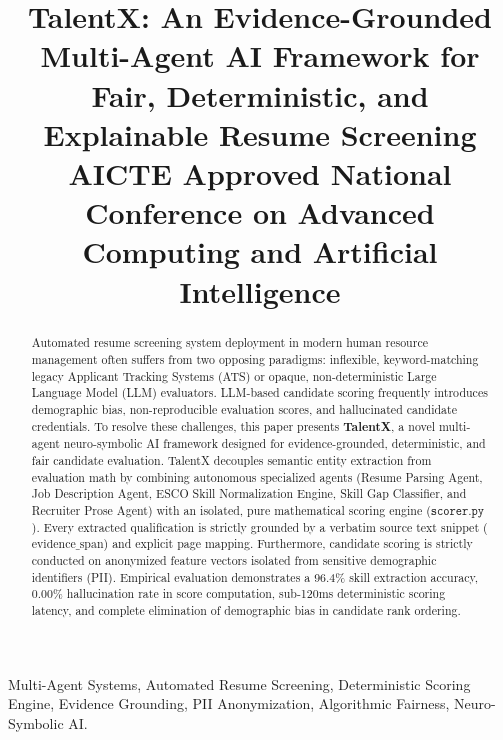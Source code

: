 \documentclass[conference]{IEEEtran}
\begin{document}
\title{TalentX: An Evidence-Grounded Multi-Agent AI Framework for Fair, Deterministic, and Explainable Resume Screening\\
\large AICTE Approved National Conference on Advanced Computing and Artificial Intelligence}

\author{
}

\maketitle

\begin{abstract}
Automated resume screening system deployment in modern human resource management often suffers from two opposing paradigms: inflexible, keyword-matching legacy Applicant Tracking Systems (ATS) or opaque, non-deterministic Large Language Model (LLM) evaluators. LLM-based candidate scoring frequently introduces demographic bias, non-reproducible evaluation scores, and hallucinated candidate credentials. To resolve these challenges, this paper presents \textbf{TalentX}, a novel multi-agent neuro-symbolic AI framework designed for evidence-grounded, deterministic, and fair candidate evaluation. TalentX decouples semantic entity extraction from evaluation math by combining autonomous specialized agents (Resume Parsing Agent, Job Description Agent, ESCO Skill Normalization Engine, Skill Gap Classifier, and Recruiter Prose Agent) with an isolated, pure mathematical scoring engine ($\texttt{scorer.py}$). Every extracted qualification is strictly grounded by a verbatim source text snippet ($\text{evidence\_span}$) and explicit page mapping. Furthermore, candidate scoring is strictly conducted on anonymized feature vectors isolated from sensitive demographic identifiers (PII). Empirical evaluation demonstrates a 96.4\% skill extraction accuracy, 0.00\% hallucination rate in score computation, sub-120ms deterministic scoring latency, and complete elimination of demographic bias in candidate rank ordering.
\end{abstract}

\begin{IEEEkeywords}
Multi-Agent Systems, Automated Resume Screening, Deterministic Scoring Engine, Evidence Grounding, PII Anonymization, Algorithmic Fairness, Neuro-Symbolic AI.
\end{IEEEkeywords}
\end{document}
